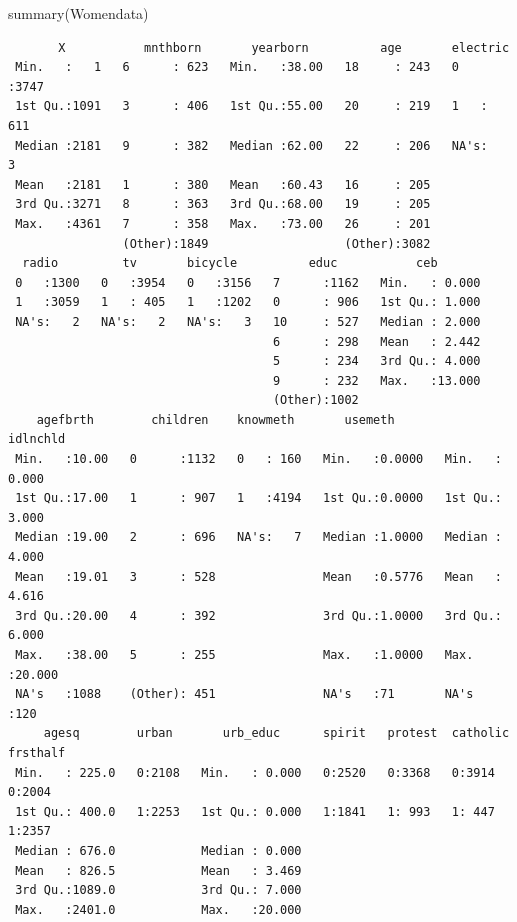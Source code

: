 \documentclass[
  letterpaper,
  DIV=11,
  numbers=noendperiod]{scrartcl}
\newenvironment{Shaded}{\begin{snugshade}}{\end{snugshade}}
\newcommand{\FunctionTok}[1]{\textcolor[rgb]{0.28,0.35,0.67}{#1}}
\newcommand{\NormalTok}[1]{\textcolor[rgb]{0.00,0.23,0.31}{#1}}
\newcommand{\OtherTok}[1]{\textcolor[rgb]{0.00,0.23,0.31}{#1}}
\newcommand{\SpecialCharTok}[1]{\textcolor[rgb]{0.37,0.37,0.37}{#1}}
\begin{document}
\begin{Shaded}
\end{Shaded}

\begin{Shaded}
\begin{Highlighting}[]
\FunctionTok{summary}\NormalTok{(Womendata)}
\end{Highlighting}
\end{Shaded}

\begin{verbatim}
       X           mnthborn       yearborn          age       electric   
 Min.   :   1   6      : 623   Min.   :38.00   18     : 243   0   :3747  
 1st Qu.:1091   3      : 406   1st Qu.:55.00   20     : 219   1   : 611  
 Median :2181   9      : 382   Median :62.00   22     : 206   NA's:   3  
 Mean   :2181   1      : 380   Mean   :60.43   16     : 205              
 3rd Qu.:3271   8      : 363   3rd Qu.:68.00   19     : 205              
 Max.   :4361   7      : 358   Max.   :73.00   26     : 201              
                (Other):1849                   (Other):3082              
  radio         tv       bicycle          educ           ceb        
 0   :1300   0   :3954   0   :3156   7      :1162   Min.   : 0.000  
 1   :3059   1   : 405   1   :1202   0      : 906   1st Qu.: 1.000  
 NA's:   2   NA's:   2   NA's:   3   10     : 527   Median : 2.000  
                                     6      : 298   Mean   : 2.442  
                                     5      : 234   3rd Qu.: 4.000  
                                     9      : 232   Max.   :13.000  
                                     (Other):1002                   
    agefbrth        children    knowmeth       usemeth          idlnchld     
 Min.   :10.00   0      :1132   0   : 160   Min.   :0.0000   Min.   : 0.000  
 1st Qu.:17.00   1      : 907   1   :4194   1st Qu.:0.0000   1st Qu.: 3.000  
 Median :19.00   2      : 696   NA's:   7   Median :1.0000   Median : 4.000  
 Mean   :19.01   3      : 528               Mean   :0.5776   Mean   : 4.616  
 3rd Qu.:20.00   4      : 392               3rd Qu.:1.0000   3rd Qu.: 6.000  
 Max.   :38.00   5      : 255               Max.   :1.0000   Max.   :20.000  
 NA's   :1088    (Other): 451               NA's   :71       NA's   :120     
     agesq        urban       urb_educ      spirit   protest  catholic frsthalf
 Min.   : 225.0   0:2108   Min.   : 0.000   0:2520   0:3368   0:3914   0:2004  
 1st Qu.: 400.0   1:2253   1st Qu.: 0.000   1:1841   1: 993   1: 447   1:2357  
 Median : 676.0            Median : 0.000                                      
 Mean   : 826.5            Mean   : 3.469                                      
 3rd Qu.:1089.0            3rd Qu.: 7.000                                      
 Max.   :2401.0            Max.   :20.000                                      
                                                                               

\end{verbatim}
\end{document}

